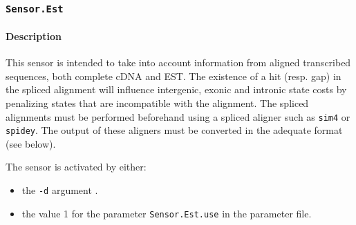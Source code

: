 
\subsubsection{\texttt{Sensor.Est}}
\label{plugest}

\paragraph{Description}

This sensor is intended to take into account information from aligned
transcribed sequences, both complete cDNA and EST. The existence of a
hit (resp. gap) in the spliced alignment will influence intergenic,
exonic and intronic state costs by penalizing states that are
incompatible with the alignment. The spliced alignments must be
performed beforehand using a spliced aligner such as \texttt{sim4} or
\texttt{spidey}. The output of these aligners must be converted in the
adequate format (see below). 

The sensor is activated by either:
\begin{itemize}
\item the \texttt{-d} argument .
\item the value 1 for the parameter \texttt{Sensor.Est.use} in
  the parameter file.
\end{itemize}

